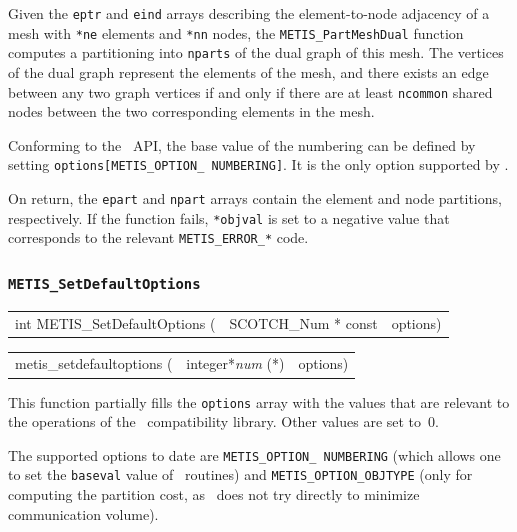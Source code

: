\begin{itemize}
\progdes

Given the \texttt{eptr} and \texttt{eind} arrays describing the
element-to-node adjacency of a mesh with \texttt{*ne} elements and
\texttt{*nn} nodes, the \texttt{METIS\_PartMeshDual} function computes a
partitioning into \texttt{nparts} of the dual graph of this mesh. The
vertices of the dual graph represent the elements of the mesh, and
there exists an edge between any two graph vertices if and only if
there are at least \texttt{ncommon} shared nodes between the two
corresponding elements in the mesh.

Conforming to the \metis\ API, the base value of the numbering
can be defined by setting \texttt{options[METIS\_\lbt OPTION\_\lbt
NUMBERING]}. It is the only option supported by \scotch.

On return, the \texttt{epart} and \texttt{npart} arrays contain the
element and node partitions, respectively.
If the function fails, \texttt{*objval} is set to a negative value
that corresponds to the relevant \texttt{METIS\_\lbt ERROR\_*} code.
\end{itemize}

\subsubsection{{\tt METIS\_SetDefaultOptions}}

\begin{itemize}
\progsyn

{\tt\begin{tabular}{l@{}ll}
int METIS\_SetDefaultOptions ( & SCOTCH\_Num * const & options)
\end{tabular}}

{\tt\begin{tabular}{l@{}ll}
metis\_setdefaultoptions ( & integer*{\it num} (*) & options)
\end{tabular}}

\progdes

This function partially fills the \texttt{options} array with the
values that are relevant to the operations of the
\metis\ compatibility library. Other values are set to~$0$.

The supported options to date are \texttt{METIS\_\lbt OPTION\_\lbt
  NUMBERING} (which allows one to set the \texttt{baseval} value of
\libscotch\ routines) and \texttt{METIS\_\lbt OPTION\_\lbt OBJTYPE}
(only for computing the partition cost, as \scotch\ does not try
directly to minimize communication volume).

\end{itemize}
